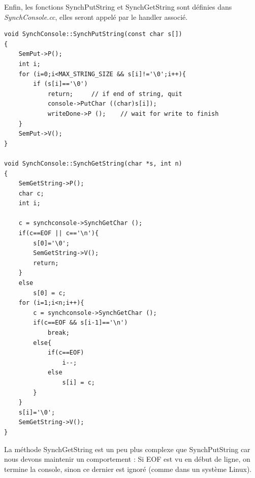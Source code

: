 \documentclass[a4paper,10pt]{article}
\begin{document}
Enfin, les fonctions SynchPutString et SynchGetString sont définies dans \textit{SynchConsole.cc}, elles seront appelé
par le handler associé.

\begin{lstlisting}[frame=single]
void SynchConsole::SynchPutString(const char s[])
{
	SemPut->P();
	int i;
	for (i=0;i<MAX_STRING_SIZE && s[i]!='\0';i++){
		if (s[i]=='\0')
			return;		// if end of string, quit
			console->PutChar ((char)s[i]);
			writeDone->P ();	// wait for write to finish
	}
	SemPut->V();
}

void SynchConsole::SynchGetString(char *s, int n)
{
	SemGetString->P();
	char c;
	int i;

	c = synchconsole->SynchGetChar ();
	if(c==EOF || c=='\n'){
		s[0]='\0';
		SemGetString->V();
		return;
	}
	else
		s[0] = c;
	for (i=1;i<n;i++){
		c = synchconsole->SynchGetChar ();
		if(c==EOF && s[i-1]=='\n')
			break;
		else{
			if(c==EOF)
				i--;
			else
				s[i] = c;
		}
	}
	s[i]='\0';
	SemGetString->V();
}
\end{lstlisting}
La méthode SynchGetString est un peu plus complexe que SynchPutString car nous devons maintenir un comportement :
Si EOF est vu en début de ligne, on termine la console, sinon ce dernier est ignoré (comme dans un système Linux).
\newpage
\end{document}
